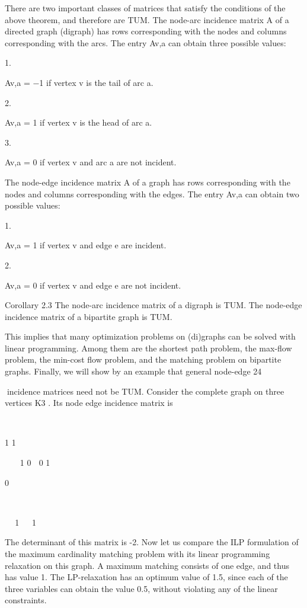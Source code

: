 \documentclass[titlepage]{book}
\theoremstyle{definition}
\begin{document}
There are two important classes of matrices that satisfy the conditions of the above theorem, and therefore
are TUM. The node-arc incidence matrix A of a directed graph (digraph) has rows corresponding with
the nodes and columns corresponding with the arcs. The entry Av,a can obtain three possible values:

1.

Av,a = −1 if vertex v is the tail of arc a.

2.

Av,a = 1 if vertex v is the head of arc a.

3.

Av,a = 0 if vertex v and arc a are not incident.

The node-edge incidence matrix A of a graph has rows corresponding with the nodes and columns
corresponding with the edges. The entry Av,a can obtain two possible values:

1.

Av,a = 1 if vertex v and edge e are incident.

2.

Av,a = 0 if vertex v and edge e are not incident.

Corollary 2.3 The node-arc incidence matrix of a digraph is TUM. The node-edge incidence matrix of
a bipartite graph is TUM.

This implies that many optimization problems on (di)graphs can be solved with linear programming.
Among them are the shortest path problem, the max-flow problem, the min-cost flow problem, and the
matching problem on bipartite graphs. Finally, we will show by an example that general node-edge
24

incidence matrices need not be TUM. Consider the complete graph on three vertices K3 . Its node edge
incidence matrix is



1 1



 1 0

0 1

0





1 

1

The determinant of this matrix is -2. Now let us compare the ILP formulation of the maximum cardinality
matching problem with its linear programming relaxation on this graph. A maximum matching consists
of one edge, and thus has value 1. The LP-relaxation has an optimum value of 1.5, since each of the three
variables can obtain the value 0.5, without violating any of the linear constraints.
\end{document}
